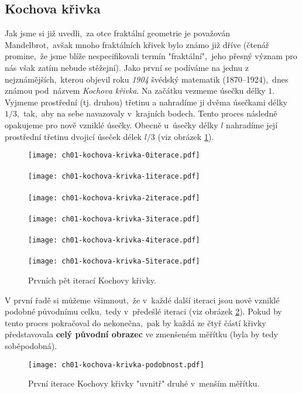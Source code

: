 \subsection{Kochova křivka}\label{subsec:kochova_krivka}
Jak jsme si již uvedli,~za otce fraktální geometrie je považován Mandelbrot,~avšak mnoho fraktálních křivek bylo známo již dříve (čtenář promine,~že jsme blíže nespecifikovali termín "fraktální",~jeho přesný význam pro nás však zatím nebude stěžejní). Jako první se podíváme na jednu z nejznámějších,~kterou objevil roku \emph{1904} švédský matematik  \mbox{(1870--1924)},~dnes známou pod~názvem \emph{Kochova křivka}. \citep[str. 61]{Peitgen2004} Na začátku vezmeme úsečku délky $1$. Vyjmeme prostřední (tj. druhou) třetinu a nahradíme ji dvěma úsečkami délky $1/3$,~tak,~aby na sebe navazovaly v~krajních bodech. Tento proces následně opakujeme pro nově vzniklé úsečky. Obecně u~úsečky délky $l$ nahradíme její prostřední třetinu dvojicí úseček délek $l/3$ (viz obrázek \ref{fig:kochova_vlocka_5iteraci}).
\begin{figure}[h]
    \centering
    \texttt{[image: ch01-kochova-krivka-0iterace.pdf]}\\\qquad\\
    \texttt{[image: ch01-kochova-krivka-1iterace.pdf]}\\\qquad\\
    \texttt{[image: ch01-kochova-krivka-2iterace.pdf]}\\\qquad\\
    \texttt{[image: ch01-kochova-krivka-3iterace.pdf]}\\\qquad\\
    \texttt{[image: ch01-kochova-krivka-4iterace.pdf]}\\\qquad\\
    \texttt{[image: ch01-kochova-krivka-5iterace.pdf]}
    \caption{Prvních pět iterací Kochovy křivky.}
    \label{fig:kochova_vlocka_5iteraci}
\end{figure}
V první řadě si můžeme všimnout,~že v~každé další iteraci jsou nově vzniklé podobné původnímu celku,~tedy v~předešlé iteraci (viz obrázek \ref{fig:kochova_krivka_podobnost}). Pokud by tento proces pokračoval do nekonečna,~pak by každá ze čtyř částí křivky představovala \textbf{celý původní obrazec} ve zmenšeném měřítku (byla by tedy soběpodobná).
\begin{figure}[h]
    \centering
    \texttt{[image: ch01-kochova-krivka-podobnost.pdf]}
    \caption{První iterace Kochovy křivky "uvnitř" druhé v~menším měřítku.}
    \label{fig:kochova_krivka_podobnost}
\end{figure}

